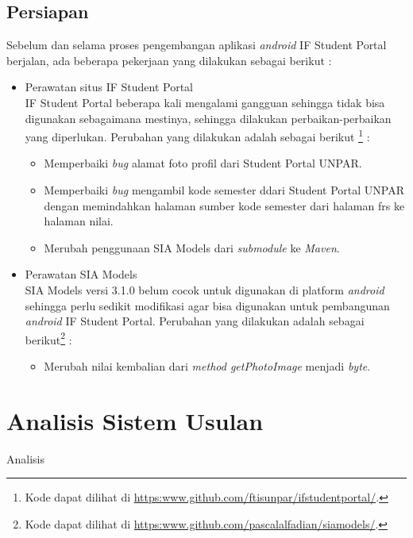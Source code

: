 \subsection{Persiapan}
Sebelum dan selama proses pengembangan aplikasi \textit{android} IF Student Portal berjalan, ada beberapa pekerjaan yang dilakukan sebagai berikut :
\begin{itemize}
    \item Perawatan situs IF Student Portal\\
    IF Student Portal beberapa kali mengalami gangguan sehingga tidak bisa digunakan sebagaimana mestinya, sehingga dilakukan perbaikan-perbaikan yang diperlukan. Perubahan yang dilakukan adalah sebagai berikut \footnote{Kode dapat dilihat di \url{https:www.github.com/ftisunpar/ifstudentportal/}.} :
    \begin{itemize}
        \item Memperbaiki \textit{bug} alamat foto profil dari Student Portal UNPAR.
        \item Memperbaiki \textit{bug} mengambil kode semester ddari Student Portal UNPAR dengan memindahkan halaman sumber kode semester dari halaman frs ke halaman nilai.
        \item Merubah penggunaan SIA Models dari \textit{submodule} ke \textit{Maven}.
    \end{itemize}
    \item Perawatan SIA Models\\
    SIA Models versi 3.1.0 belum cocok untuk digunakan di platform \textit{android} sehingga perlu sedikit modifikasi agar bisa digunakan untuk pembangunan \textit{android} IF Student Portal. Perubahan yang dilakukan adalah sebagai berikut\footnote{Kode dapat dilihat di \url{https:www.github.com/pascalalfadian/siamodels/}.} :
    \begin{itemize}
        \item Merubah nilai kembalian dari \textit{method getPhotoImage} menjadi \textit{byte}.
    \end{itemize}
\end{itemize}


\section{Analisis Sistem Usulan}
Analisis

